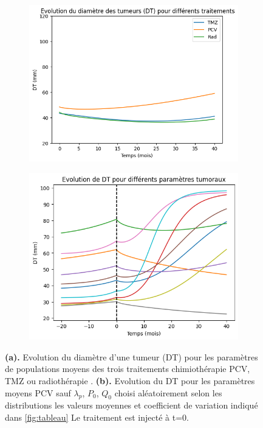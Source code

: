\documentclass[12pt,a4paper]{article}
\begin{document}
\begin{figure}
    \centering
    \begin{subfigure}[t]{0.45\textwidth}
        \centering
        \includegraphics[width=\linewidth]{Image/evolution_TD_param_moy.png} 
        \caption{} \label{fig:evol_moy}
    \end{subfigure}
    \hfill
    \begin{subfigure}[t]{0.45\textwidth}
        \centering
        \includegraphics[width=\linewidth]{Image/ex_traj.png} 
        \caption{} \label{fig:rand_traj}
    \end{subfigure}

    \caption{\textbf{(a).} Evolution du diamètre d'une tumeur (DT) pour les paramètres de populations moyens des trois traitements chimiothérapie PCV, TMZ ou radiothérapie \cite{}. \textbf{(b).} Evolution du DT pour les paramètres moyens PCV sauf $\lambda_{p}$, $P_{0}$, $Q_{0}$ choisi aléatoirement selon les distributions les valeurs moyennes et coefficient de variation indiqué dans \ref{fig:tableau} Le traitement est injecté à t=0. }
\end{figure}
\end{document}

